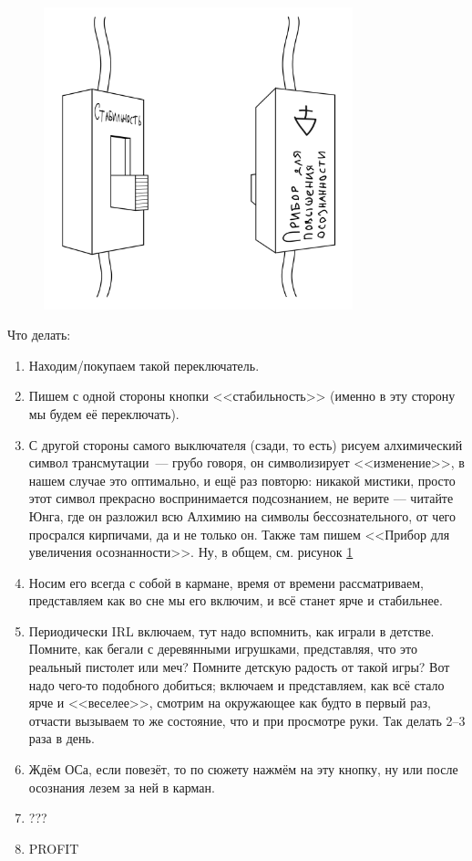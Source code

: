 \documentclass[a4paper,14pt,oneside]{memoir}
\begin{document}
\begin{figure}[h!]

\begin{center}
\includegraphics[width=0.8\textwidth]{ris111.png}
\end{center}
\caption{}
\label{sitem}
\end{figure}

\clearpage

Что делать:
\begin{enumerate}
\item Находим/покупаем такой переключатель.
\item Пишем с одной стороны кнопки <<стабильность>> (именно в эту сторону мы будем её переключать).
\item С другой стороны самого выключателя (сзади, то есть) рисуем алхимический символ трансмутации~--- грубо говоря, он символизирует <<изменение>>, в нашем случае это оптимально, и ещё раз повторю: никакой мистики, просто этот символ прекрасно воспринимается подсознанием, не верите — читайте Юнга, где он разложил всю Алхимию на символы бессознательного, от чего просрался кирпичами, да и не только он. Также там пишем <<Прибор для увеличения осознанности>>. Ну, в общем, см. рисунок \ref{sitem} 
\item Носим его всегда с собой в кармане, время от времени рассматриваем, представляем как во сне мы его включим, и всё станет ярче и стабильнее. 
\item Периодически IRL включаем, тут надо вспомнить, как играли в детстве. Помните, как бегали с деревянными игрушками, представляя, что это реальный пистолет или меч? Помните детскую радость от такой игры? Вот надо чего-то подобного добиться; включаем и представляем, как всё стало ярче и <<веселее>>, смотрим на окружающее как будто в первый раз, отчасти вызываем то же состояние, что и при просмотре руки. Так делать 2--3 раза в день. 
\item Ждём ОСа, если повезёт, то по сюжету нажмём на эту кнопку, ну или после осознания лезем за ней в карман. 
\item ???
\item PROFIT
\end{enumerate}
\end{document}
